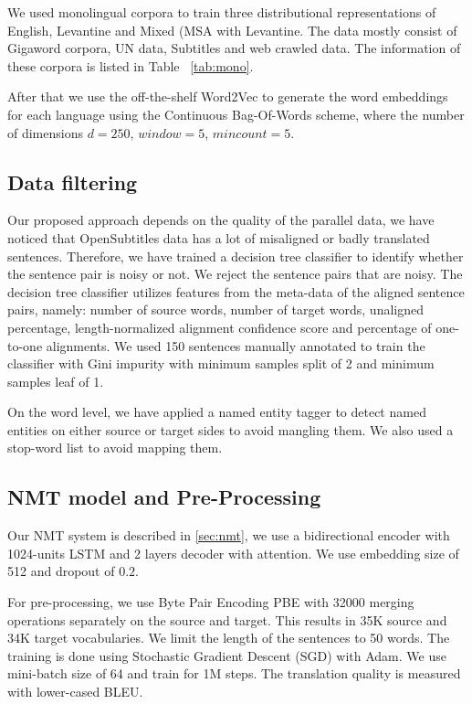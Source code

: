\documentclass[a4paper]{article}
\begin{document}
We used monolingual corpora to  train three distributional representations of English, Levantine and Mixed (MSA with Levantine. The  data mostly consist of  Gigaword corpora, UN data, Subtitles  and web crawled data.
The information of these  corpora  is listed in Table ~\ref{tab:mono}.


After that we use the off-the-shelf  {\sf Word2Vec} \cite{MikolovSCCD13}
 to generate the word embeddings for each language using
the Continuous Bag-Of-Words scheme, where the number of dimensions $d=250$, 
$window=5$, $mincount=5$.



\subsection {Data filtering}
\label{sec:filter}
Our proposed approach depends on the quality of the  parallel data, we have noticed that OpenSubtitles data has a lot of misaligned or badly translated sentences. Therefore, we have trained a decision tree classifier to identify whether the sentence pair is noisy or not. We reject the sentence pairs that are noisy. The decision tree classifier utilizes features from the meta-data of the aligned sentence pairs, namely:  number of source words, number of target words,   unaligned percentage, length-normalized alignment confidence score and percentage of one-to-one alignments. We used 150 sentences manually  annotated to train the classifier with  Gini impurity with minimum samples split of 2 and minimum samples leaf of 1.

On the word level, we have applied a named entity tagger to detect named entities on either source or target sides to avoid mangling  them. We also used a stop-word list to avoid mapping them.


\subsection{NMT model and Pre-Processing}

Our NMT system is described in \textsection\ref{sec:nmt}, we use a bidirectional encoder with 1024-units LSTM and 2 layers decoder with attention. We use  embedding size of 512 and dropout of $0.2$. 

For pre-processing, we use Byte Pair Encoding PBE \cite{SennrichHB16a} with 32000 merging operations separately on the  source and target. This results in 35K source  and 34K target vocabularies. We limit the length of the sentences to 50 words. The training is done using Stochastic Gradient Descent (SGD) with Adam\cite{KingmaB14}.  We use mini-batch size of 64 and train for 1M steps. The translation quality is measured with lower-cased BLEU.
\end{document}
